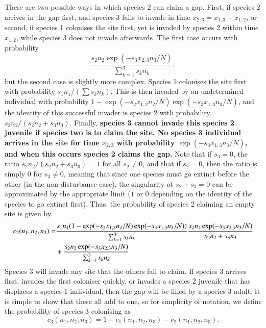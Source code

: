 There are two possible ways in which species 2 can claim a gap. First, if species 2 arrives in the gap first, and species 3 fails to invade in time $x_{2,3}=x_{1,3}-x_{1,2}$, or second, if species 1 colonises the site first, yet is invaded by species 2 within time $x_{1,2}$, while species 3 does not invade afterwards. The first case occurs with probability
$$
\frac{s_2 n_2\exp(-s_3x_{2,3}n_3/N)}{\sum_{k=1}^3 s_k n_k},
$$
but the second case is slightly more complex. Species 1 colonises the site first with probability $s_1n_1/(\sum s_kn_k)$. This is then invaded by an undetermined individual with probability $1-\exp(-s_2x_{1,2}n_2/N)\exp(-s_3x_{1,3}n_3/N)$, and the identity of this successful invader is species 2 with probability $s_2n_2/(s_2n_2+s_3n_3)$. Finally, \textbf{species 3 cannot invade this species 2 juvenile if species two is to claim the site. No species 3 individual arrives in the site for time $x_{2,3}$ with probability $\exp(-s_3x_{1,3}n_3/N)$, and when this occurs species 2 claims the gap.} Note that if $s_3=0$, the ratio $s_2n_2/(s_2n_2+s_3n_3)=1$ for all $s_2 \neq 0$, and that if $s_2=0$, then the ratio is simply $0$ for $s_3 \neq0$, meaning that since one species must go extinct before the other (in the non-disturbance case), the singularity at $s_2+s_3=0$ can be approximated by the appropriate limit ($1$ or $0$ depending on the identity of the species to go extinct first). Thus, the probability of species 2 claiming an empty site is given by
\begin{align}
\label{c2}
c_2(n_1,n_2,n_3)=&\frac{s_1 n_1(1-\exp(-s_2x_{1,2}n_2/N)\exp(-s_3x_{1,3}n_3/N))}{\sum_{k=1}^3 s_k n_k}\frac{s_2 n_2\exp(-s_3x_{2,3}n_3/N)}{s_2n_2+s_3n_3} \notag \\
&+\frac{s_2 n_2\exp(-s_3x_{2,3}n_3/N)}{\sum_{k=1}^3 s_k n_k}
\end{align}
Species 3 will invade any site that the others fail to claim. If species 3 arrives first, invades the first coloniser quickly, or invades a species 2 juvenile that has displaces a species 1 individual, then the gap will be filled by a species 3 adult. It is simple to show that these all add to one, so for simplicity of notation, we define the probability of species 3 colonising as
\begin{equation}
\label{c3}
c_3(n_1,n_2,n_3)=1-c_1(n_1,n_2,n_3)-c_2(n_1,n_2,n_3).\end{equation}


